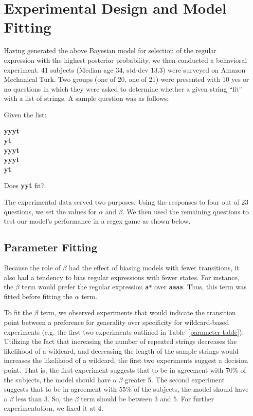 \documentclass[10pt,letterpaper]{article}
\begin{document}
\section{Experimental Design and Model Fitting}
Having generated the above Bayesian model for selection of the regular expression with the highest posterior probability, we then conducted a behavioral experiment.  41 subjects (Median age 34, std-dev 13.3) were surveyed on Amazon Mechanical Turk. Two groups (one of 20, one of 21) were presented with 10 yes or no questions in which they were asked to determine whether a given string ``fit'' with a list of strings. A sample question was as follows:
\begin{center}Given the list:

\textbf{yyyt \\
yt \\
yyyt \\
yyyt \\ 
yt}

Does \textbf{yyt} fit?
\end{center}

The experimental data served two purposes. Using the responses to four out of 23 questions, we set the values for $\alpha$ and $\beta$. We then used the remaining questions to test our model's performance in a regex game as shown below. 

\subsection{Parameter Fitting}
Because the role of $\beta$ had the effect of biasing models with fewer transitions, it also had a tendency to bias regular expressions with fewer states. For instance, the $\beta$ term would prefer the regular expression \verb!a*! over \verb!aaaa!. Thus, this term was fitted before fitting the $\alpha$ term.

To fit the $\beta$ term, we observed experiments that would indicate the transition point between a preference for generality over specificity for wildcard-based experiments (e.g. the first two experiments outlined in Table~\ref{parameter-table}). Utilizing the fact that increasing the number of repeated strings decreases the likelihood of a wildcard, and decreasing the length of the sample strings would increases the likelihood of a wildcard, the first two experiments suggest a decision point. That is, the first experiment suggests that to be in agreement with 70\% of the subjects, the model should have a $\beta$ greater 5. The second experiment suggests that to be in agreement with 55\% of the subjects, the model should have a $\beta$ less than 3. So, the $\beta$ term should be between $3$ and $5$. For further experimentation, we fixed it at $4$.
\end{document}
